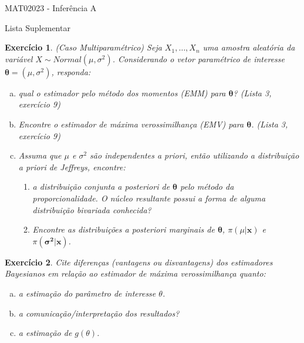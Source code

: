 \documentclass[letter,11pt]{article}
\newtheorem{exer}{Exercício}
\begin{document}
\begin{center}{ \Large MAT02023 - Inferência A }\end{center}

\begin{center}
{\large  \sc Lista Suplementar}
\end{center}
\vspace{15mm}

\begin{exer} \rm (Caso Multiparamétrico)  
Seja $X_1, \ldots, X_n$ uma amostra aleatória da variável $X \sim Normal(\mu, \sigma^2)$. Considerando o vetor paramétrico de interesse $\boldsymbol{\theta} = (\mu, \sigma^2)$, responda:  
\begin{enumerate}[a)]
	\item qual o estimador pelo método dos momentos (EMM) para $\boldsymbol{\theta}$? (Lista 3, exercício 9)
  \item Encontre o estimador de máxima verossimilhança (EMV) para $\boldsymbol{\theta}$. (Lista 3, exercício 9)   
  \item Assuma que $\mu$ e $\sigma^2$ são independentes \textit{a priori}, então utilizando a distribuição \textit{a priori} de Jeffreys, encontre:
  \begin{enumerate}
    \item a distribuição conjunta \textit{a posteriori} de $\boldsymbol{\theta}$ pelo método da proporcionalidade. O núcleo resultante possui a forma de alguma distribuição bivariada conhecida? 
    \item Encontre as distribuições \textit{a posteriori} marginais de $\boldsymbol{\theta}$, $\pi(\mu \vert \boldsymbol{x})$ e $\pi(\boldsymbol{\sigma^2} \vert \boldsymbol{x})$.  
  \end{enumerate}
\end{enumerate}
\end{exer}


\bigskip
\begin{exer} \rm 
Cite diferenças (vantagens ou disvantagens) dos estimadores Bayesianos em relação ao estimador de máxima verossimilhança quanto:
\begin{enumerate}[a)]
  \item a estimação do parâmetro de interesse $\theta$.
  \item a comunicação/interpretação dos resultados?
  \item a estimação de $g(\theta)$.
\end{enumerate}
\end{exer}
\end{document}
